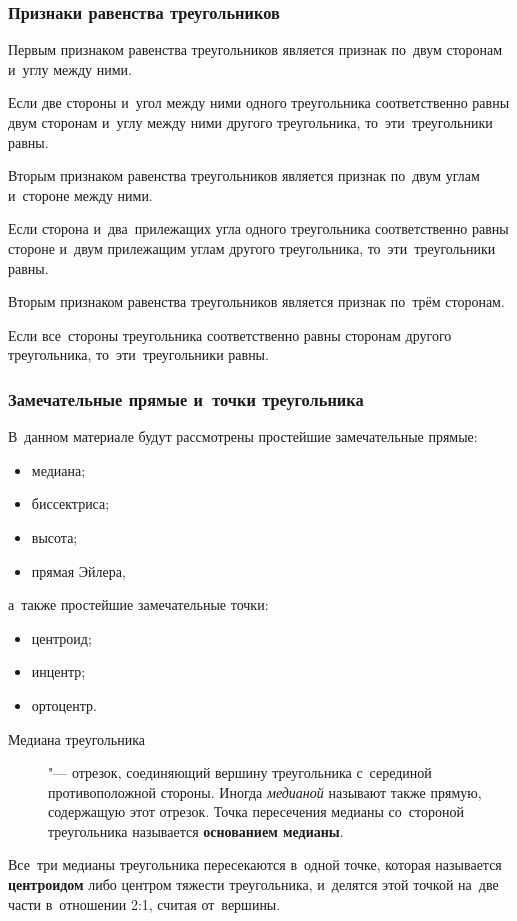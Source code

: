 \documentclass[]{scrartcl}
\begin{document}
\subsubsection{Признаки равенства треугольников}
Первым признаком равенства треугольников является признак по~двум сторонам и~углу между ними.
\begin{theorem}
	Если две стороны и~угол между ними одного треугольника соответственно равны двум сторонам и~углу между ними другого треугольника, то~эти~треугольники равны.
\end{theorem}
Вторым признаком равенства треугольников является признак по~двум углам и~стороне между ними.
\begin{theorem}
	Если сторона и~два~прилежащих угла одного треугольника соответственно равны стороне и~двум прилежащим углам другого треугольника, то~эти~треугольники равны.
\end{theorem}
Вторым признаком равенства треугольников является признак по~трём сторонам.
\begin{theorem}
	Если все~стороны треугольника соответственно равны сторонам другого треугольника, то~эти~треугольники равны.
\end{theorem}

\subsubsection{Замечательные прямые и~точки треугольника}
В~данном материале будут рассмотрены простейшие замечательные прямые:
\begin{itemize}
	\item медиана;
	\item биссектриса;
	\item высота;
	\item прямая Эйлера,
\end{itemize}
а~также простейшие замечательные точки:
\begin{itemize}
	\item центроид;
	\item инцентр;
	\item ортоцентр.
\end{itemize}

\begin{description}
	\item[Медиана треугольника] "--- отрезок, соединяющий вершину треугольника с~серединой противоположной стороны. Иногда \emph{медианой} называют также прямую, содержащую этот отрезок. Точка пересечения медианы со~стороной треугольника называется \textbf{основанием медианы}.
\end{description}
Все~три медианы треугольника пересекаются в~одной точке, которая называется \textbf{центроидом} либо центром тяжести треугольника, и~делятся этой точкой на~две части в~отношении 2:1, считая от~вершины.
\end{document}
